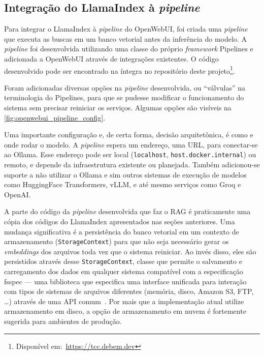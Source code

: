 \documentclass[journal]{IEEEtran}
\begin{document}
\subsection{Integração do LlamaIndex à \textit{pipeline}}

\noindent%
Para integrar o LlamaIndex à \textit{pipeline} do OpenWebUI, foi criada uma \textit{pipeline} que executa as buscas em um banco vetorial antes da inferência do modelo.
A \textit{pipeline} foi desenvolvida utilizando uma classe do próprio \textit{framework} Pipelines e adicionada a OpenWebUI através de integrações existentes.
O código desenvolvido pode ser encontrado na íntegra no repositório deste projeto\footnote{Disponível em:~\url{https://tcc.debem.dev}}.

Foram adicionadas diversas opções na \textit{pipeline} desenvolvida, ou ``válvulas'' na terminologia do Pipelines, para que se pudesse modificar o funcionamento do sistema sem precisar reiniciar os serviços.
Algumas opções são visíveis na \autoref{fig:openwebui_pipeline_config}.

Uma importante configuração e, de certa forma, decisão arquitetônica, é como e onde rodar o modelo.
A \textit{pipeline} espera um endereço, uma URL, para conectar-se ao Ollama.
Esse endereço pode ser local (\texttt{localhost}, \texttt{host.docker.internal}) ou remoto, e depende da infraestrutura existente ou planejada.
Também adicionou-se suporte a não utilizar o Ollama e sim outros sistemas de execução de modelos como HuggingFace Transformers, vLLM, e até mesmo serviços como Groq e OpenAI\@.

A parte do código da \textit{pipeline} desenvolvida que faz o RAG é praticamente uma cópia dos códigos do LlamaIndex apresentados nas seções anteriores.
Uma mudança significativa é a persistência do banco vetorial em um contexto de armazenamento (\texttt{StorageContext}) para que não seja necessário gerar os \textit{embeddings} dos arquivos toda vez que o sistema reiniciar.
Ao invés disso, eles são persistidos através desse \texttt{StorageContext}, classe que permite o salvamento e carregamento dos dados em qualquer sistema compatível com a especificação fsspec --- uma biblioteca que especifica uma interface unificada para interação com tipos de sistemas de arquivos diferentes (memória, disco, Amazon S3, FTP, \ldots) através de uma API comum~\cite{Liu_LlamaIndex_2022,fsspec}.
Por mais que a implementação atual utilize armazenamento em disco, a opção de armazenamento em nuvem é fortemente sugerida para ambientes de produção.
\end{document}
